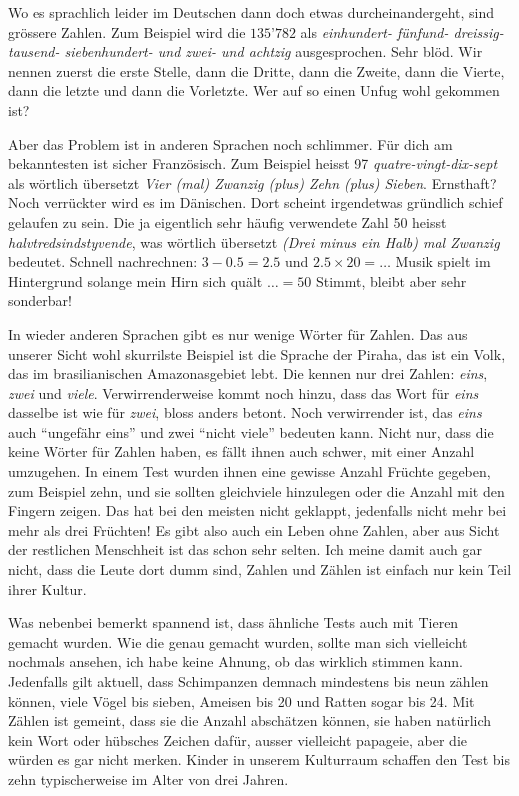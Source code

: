 Wo es sprachlich leider im Deutschen dann doch etwas durcheinandergeht, sind grössere Zahlen. Zum Beispiel wird die $135’782$ als \textit{einhundert- fünfund- dreissig- tausend- siebenhundert- und zwei- und achtzig} ausgesprochen. Sehr blöd. Wir nennen zuerst die erste Stelle, dann die Dritte, dann die Zweite, dann die Vierte, dann die letzte und dann die Vorletzte. Wer auf so einen Unfug wohl gekommen ist?

Aber das Problem ist in anderen Sprachen noch schlimmer. Für dich am bekanntesten ist sicher Französisch. Zum Beispiel heisst 97 \textit{quatre-vingt-dix-sept} als wörtlich übersetzt \textit{Vier (mal) Zwanzig (plus) Zehn (plus) Sieben}. Ernsthaft? Noch verrückter wird es im Dänischen. Dort scheint irgendetwas gründlich schief gelaufen zu sein. Die ja eigentlich sehr häufig verwendete Zahl 50 heisst \textit{halvtredsindstyvende}, was wörtlich übersetzt \textit{(Drei minus ein Halb) mal Zwanzig} bedeutet. Schnell nachrechnen: $3-0.5 = 2.5$ und $2.5\times20=\dots$ Musik spielt im Hintergrund solange mein Hirn sich quält $\dots = 50$ Stimmt, bleibt aber sehr sonderbar!

In wieder anderen Sprachen gibt es nur wenige Wörter für Zahlen. Das aus unserer Sicht wohl skurrilste Beispiel ist die Sprache der Piraha, das ist ein Volk, das im brasilianischen Amazonasgebiet lebt. Die kennen nur drei Zahlen: \textit{eins}, \textit{zwei} und \textit{viele}. Verwirrenderweise kommt noch hinzu, dass das Wort für \textit{eins} dasselbe ist wie für \textit{zwei}, bloss anders betont. Noch verwirrender ist, das \textit{eins} auch \enquote{ungefähr eins} und zwei \enquote{nicht viele} bedeuten kann. Nicht nur, dass die keine Wörter für Zahlen haben, es fällt ihnen auch schwer, mit einer Anzahl umzugehen. In einem Test wurden ihnen eine gewisse Anzahl Früchte gegeben, zum Beispiel zehn, und sie sollten gleichviele hinzulegen oder die Anzahl mit den Fingern zeigen. Das hat bei den meisten nicht geklappt, jedenfalls nicht mehr bei mehr als drei Früchten! Es gibt also auch ein Leben ohne Zahlen, aber aus Sicht der restlichen Menschheit ist das schon sehr selten. Ich meine damit auch gar nicht, dass die Leute dort dumm sind, Zahlen und Zählen ist einfach nur kein Teil ihrer Kultur.

Was nebenbei bemerkt spannend ist, dass ähnliche Tests auch mit Tieren gemacht wurden. Wie die genau gemacht wurden, sollte man sich vielleicht nochmals ansehen, ich habe keine Ahnung, ob das wirklich stimmen kann. Jedenfalls gilt aktuell, dass Schimpanzen demnach mindestens bis neun zählen können, viele Vögel bis sieben, Ameisen bis 20 und Ratten sogar bis 24. Mit Zählen ist gemeint, dass sie die Anzahl abschätzen können, sie haben natürlich kein Wort oder hübsches Zeichen dafür, ausser vielleicht papageie, aber die würden es gar nicht merken. Kinder in unserem Kulturraum schaffen den Test bis zehn typischerweise im Alter von drei Jahren.
